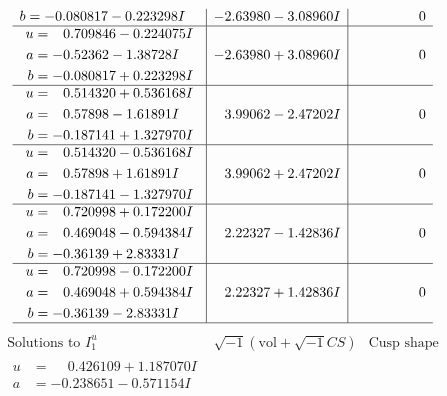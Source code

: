 \documentclass[1p]{elsarticle_modified}
\theoremstyle{definition}
\newcommand{\I}{\sqrt{-1}}
\begin{document}
$$\begin{array}{c|c|c}
\begin{aligned}
b &= -0.080817 - 0.223298 I\end{aligned}
 & -2.63980 - 3.08960 I & \phantom{-0.000000 } 0 \\ \hline\begin{aligned}
u &= \phantom{-}0.709846 - 0.224075 I \\
a &= -0.52362 - 1.38728 I \\
b &= -0.080817 + 0.223298 I\end{aligned}
 & -2.63980 + 3.08960 I & \phantom{-0.000000 } 0 \\ \hline\begin{aligned}
u &= \phantom{-}0.514320 + 0.536168 I \\
a &= \phantom{-}0.57898 - 1.61891 I \\
b &= -0.187141 + 1.327970 I\end{aligned}
 & \phantom{-}3.99062 - 2.47202 I & \phantom{-0.000000 } 0 \\ \hline\begin{aligned}
u &= \phantom{-}0.514320 - 0.536168 I \\
a &= \phantom{-}0.57898 + 1.61891 I \\
b &= -0.187141 - 1.327970 I\end{aligned}
 & \phantom{-}3.99062 + 2.47202 I & \phantom{-0.000000 } 0 \\ \hline\begin{aligned}
u &= \phantom{-}0.720998 + 0.172200 I \\
a &= \phantom{-}0.469048 - 0.594384 I \\
b &= -0.36139 + 2.83331 I\end{aligned}
 & \phantom{-}2.22327 - 1.42836 I & \phantom{-0.000000 } 0 \\ \hline\begin{aligned}
u &= \phantom{-}0.720998 - 0.172200 I \\
a &= \phantom{-}0.469048 + 0.594384 I \\
b &= -0.36139 - 2.83331 I\end{aligned}
 & \phantom{-}2.22327 + 1.42836 I & \phantom{-0.000000 } 0\\
 \hline 
 \end{array}$$\newpage$$\begin{array}{c|c|c}  
\text{Solutions to }I^u_{1}& \I (\text{vol} + \sqrt{-1}CS) & \text{Cusp shape}\\
 \hline 
\begin{aligned}
u &= \phantom{-}0.426109 + 1.187070 I \\
a &= -0.238651 - 0.571154 I \\

\end{aligned}
\end{array}$$
\end{document}
